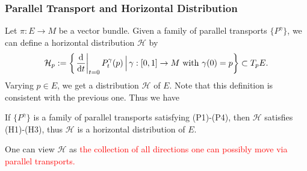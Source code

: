 \subsubsection*{Parallel Transport and Horizontal Distribution}
Let $\pi: E \to M$ be a vector bundle. 
Given a family of parallel transports $\{P^\gamma\}$, we can define a horizontal distribution $\mathcal{H}$ by
\begin{equation*}
    \mathcal{H}_p := \left\{\left.\frac{{\rm d} }{{\rm d} t}\right|_{t=0}P^{\gamma}_t(p)\,\Big|\, \gamma: [0,1] \to M \text{ with } \gamma(0) = p \right\}
    \subset T_p E.
\end{equation*}
Varying $p\in E$, we get a distribution $\mathcal{H}$ of $E$. Note that this definition is consistent with the previous one. Thus we have 
\begin{theorem}
    If $\{P^\gamma\}$ is a family of parallel transports satisfying (P1)-(P4), then $\mathcal{H}$ satisfies (H1)-(H3), 
    thus $\mathcal{H}$ is a horizontal distribution of $E$.
\end{theorem}

One can view $\mathcal{H}$ as \textcolor{red}{the collection of all directions one can possibly move via parallel transports.}

